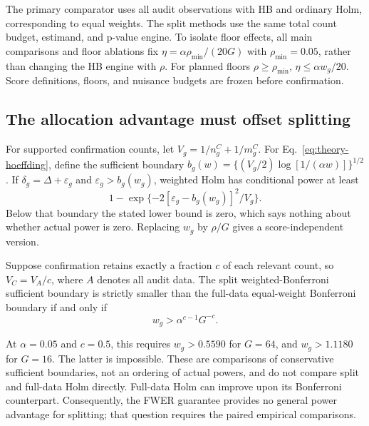 The primary comparator uses all audit observations with HB and ordinary
Holm, corresponding to equal weights. The split methods use the same total
count budget, estimand, and p-value engine. To isolate floor effects, all
main comparisons and floor ablations fix
$\eta=\alpha\rho_{\min}/(20G)$ with $\rho_{\min}=0.05$, rather than changing
the HB engine with $\rho$. For planned floors $\rho\ge\rho_{\min}$,
$\eta\le\alpha w_g/20$. Score definitions, floors, and nuisance budgets
are frozen before confirmation.

\subsection{The allocation advantage must offset splitting}

For supported confirmation counts, let $V_g=1/n_g^C+1/m_g^C$.
For Eq.~\eqref{eq:theory-hoeffding}, define the sufficient boundary
$b_g(w)=\{(V_g/2)\log[1/(\alpha w)]\}^{1/2}$. If
$\delta_g=\Delta+\varepsilon_g$ and $\varepsilon_g>b_g(w_g)$,
weighted Holm has conditional power at least
\begin{equation}
 1-\exp\{-2[\varepsilon_g-b_g(w_g)]^2/V_g\}.
 \label{eq:theory-power-envelope}
\end{equation}
Below that boundary the stated lower bound is zero, which says nothing
about whether actual power is zero. Replacing $w_g$ by $\rho/G$ gives a
score-independent version.

\begin{corollary}
\label{cor:theory-split}
Suppose confirmation retains exactly a fraction $c$ of each relevant count,
so $V_C=V_A/c$, where $A$ denotes all audit data. The split
weighted-Bonferroni sufficient boundary is strictly smaller than the
full-data equal-weight Bonferroni boundary if and only if
\begin{equation}
 w_g>\alpha^{c-1}G^{-c}.
 \label{eq:theory-split-cost}
\end{equation}
\end{corollary}

At $\alpha=0.05$ and $c=0.5$, this requires $w_g>0.5590$ for $G=64$,
and $w_g>1.1180$ for $G=16$. The latter is impossible. These are
comparisons of conservative sufficient boundaries, not an ordering of
actual powers, and do not compare split and full-data Holm directly.
Full-data Holm can improve upon its Bonferroni counterpart. Consequently,
the FWER guarantee provides no general power advantage for splitting;
that question requires the paired empirical comparisons.
